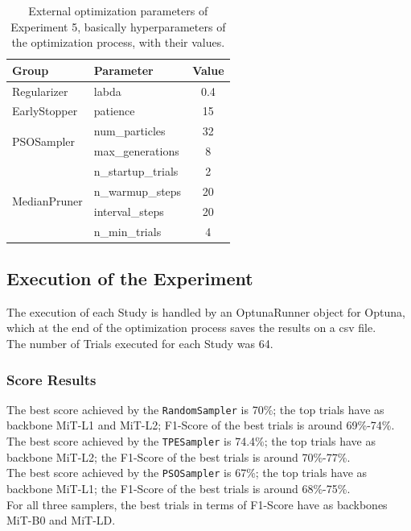 \begin{table}[ht!]
	\center
	\setlength{\tabcolsep}{0.5cm}
	\caption[Optimization External Parameters of Experiment 5]{External optimization parameters of Experiment 5, basically hyperparameters of the optimization process, with their values.}
	\begin{tabular}{@{}llc@{}}
		\toprule
		\textbf{Group}                & \textbf{Parameter} & \textbf{Value} \\ \midrule
		Regularizer                   & labda              & 0.4            \\[0.1cm]
		EarlyStopper                  & patience           & 15             \\[0.2cm]
		\multirow{2}{*}{PSOSampler}   & num\_particles     & 32             \\[0.1cm]
									  & max\_generations   & 8              \\[0.2cm]
		\multirow{4}{*}{MedianPruner} & n\_startup\_trials & 2              \\[0.1cm]
									  & n\_warmup\_steps   & 20             \\[0.1cm]
									  & interval\_steps    & 20             \\[0.1cm]
									  & n\_min\_trials     & 4              \\ \bottomrule
	\end{tabular}
	\label{tab:table-4.5.2}
\end{table}

\subsection{Execution of the Experiment}

The execution of each Study is handled by an OptunaRunner object for Optuna, which at the end of the optimization process saves the results on a csv file.
\\[0.3cm]The number of Trials executed for each Study was 64.

\subsubsection{Score Results}

The best score achieved by the \texttt{RandomSampler} is 70\%; the top trials have as backbone MiT-L1 and MiT-L2; F1-Score of the best trials is around 69\%-74\%.
\\[0.3cm]The best score achieved by the \texttt{TPESampler} is 74.4\%; the top trials have as backbone MiT-L2; the F1-Score of the best trials is around 70\%-77\%.
\\[0.3cm]The best score achieved by the \texttt{PSOSampler} is 67\%; the top trials have as backbone MiT-L1; the F1-Score of the best trials is around 68\%-75\%.
\\[0.3cm]For all three samplers, the best trials in terms of F1-Score have as backbones MiT-B0 and MiT-LD.

